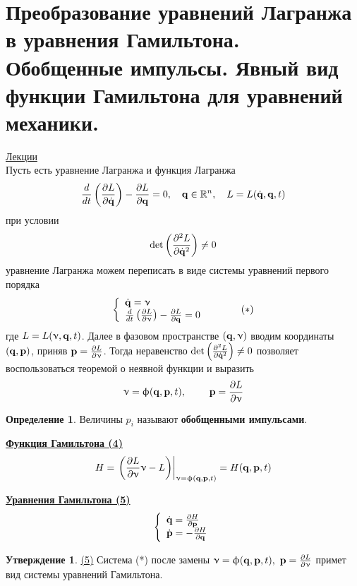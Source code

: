 \documentclass[specialist, subf, href, colorlinks=true, 12pt, times, mtpro, final]{disser}
\theoremstyle{definition}
\newtheorem{defn}{Определение}[section]
\newtheorem{state}{Утверждение}[section]
\def\bfphi{\upphi}
\def\bfnu{\upnu}
\begin{document}
    \section{Преобразование уравнений Лагранжа в уравнения Гамильтона. Обобщенные импульсы. Явный вид функции Гамильтона для уравнений механики.}
     \label{13}
     \hyperlink {lects.15}{Лекции} \\
     	Пусть есть уравнение Лагранжа и функция Лагранжа
     	$$
     		\frac{d}{dt}\left( \frac{\partial L}{\partial \dot{\mathbf{q}}} \right) - \frac{\partial L}{\partial\mathbf{q}} = 0, \ \ \ \mathbf{q} \in \mathbb{R}^n, \ \ \ L=L(\dot{\mathbf{q}},\mathbf{q},t)
     	$$
     	при условии
     	$$
     		\det \left(\frac{\partial^2 L}{\partial \dot{\mathbf{q}}^2}\right) \ne 0
     	$$
     	уравнение Лагранжа можем переписать в виде системы уравнений первого порядка
     	$$
     		\left\{
     			\begin{array}{l}
     				\dot{\bfq} = \bfnu \\
     				\frac{d}{dt}\left( \frac{\partial L}{\partial \bfnu} \right) - \frac{\partial L}{\partial\bfq} = 0 \\
     			\end{array}
     		\right. \ \ \ \ \ \ \ \ \ \ (*)
     	$$
     	где $L = L(\bfnu, \bfq, t)$. Далее в фазовом пространстве $(\bfq,\bfnu)$ вводим координаты $(\mathbf{q},\mathbf{p})$, приняв $\bfp = \frac{\partial L}{\partial \bfnu}$. Тогда неравенство $\det \left(\frac{\partial^2 L}{\partial \dot{\mathbf{q}}^2}\right) \ne 0$ позволяет воспользоваться теоремой о неявной функции и выразить 
     	$$
     		\bfnu = \bfphi (\bfq, \bfp, t), \ \ \ \ \ \ \ \bfp = \frac{\partial L}{\partial \bfnu}
     	$$
     	\begin{defn}
     		Величины $p_i$ называют \textbf{обобщенными импульсами}.
     	\end{defn}
     	
     	\bigskip
     	\textbf {\hyperlink {lects.15}{Функция Гамильтона (4)}}
     	$$
     		H = \left. \left( \frac{\partial L}{\partial \bfnu} \bfnu - L \right) \right|_{\bfnu = \bfphi (\bfq, \bfp, t)} = H(\bfq,\bfp,t)
     	$$
     	
     	\bigskip
     	\textbf {\hyperlink {lects.15}{Уравнения Гамильтона (5)} \\}
     	$$
     		\left\{
     			\begin{array}{l}
     				\dot{\mathbf{q}} = \frac{\partial H}{\partial \mathbf{p}} \\
     				\dot{\mathbf{p}} = -\frac{\partial H}{\partial \mathbf{q}}
     			\end{array}
     		\right.
     	$$
     	\begin{state} 
     		\hyperlink {lects.15}{(5)} Система (*) после замены $\bfnu = \bfphi (\bfq, \bfp, t), \ \bfp = \frac{\partial L}{\partial \bfnu}$ примет вид системы уравнений Гамильтона.
     	\end{state}
     	
\end{document}
